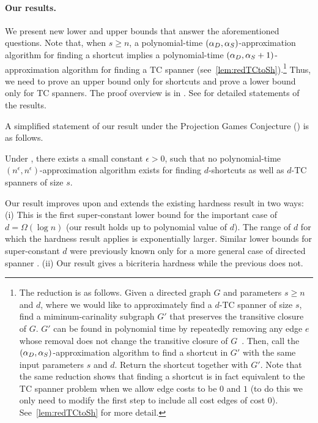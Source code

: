 \paragraph{Our results.} 
We present new lower and upper bounds that answer the aforementioned questions. 
Note that, when $s\geq n$, a polynomial-time $(\alpha_D,\alpha_S)$-approximation algorithm for finding a shortcut implies a polynomial-time $(\alpha_D,\alpha_S+1)$-approximation algorithm for finding a TC spanner (see~\cref{lem:redTCtoSh}).\footnote{
The reduction is as follows. Given a directed graph $G$ and parameters $s\geq n$ and $d$, where we would like to approximately find a $d$-TC spanner of size $s$, find a miminum-carinality subgraph $G'$ that preserves the transitive closure of $G$. $G'$ can be found in polynomial time by repeatedly removing any edge $e$ whose removal does not change the transitive closure of $G$~\cite{AhoGU72}.
Then, call the $(\alpha_D, \alpha_S)$-approximation algorithm to find a shortcut in $G'$ with the same input parameters $s$ and $d$. Return the shortcut together with $G'$. 
Note that the same reduction shows that finding a shortcut is in fact equivalent to the TC spanner problem when we allow edge costs to be $0$ and $1$ (to do this we only need to modify the first step to include all cost edges of cost 0). See~\cref{lem:redTCtoSh} for more detail.}
Thus, we need to prove an upper bound only for shortcuts and prove a lower bound only for TC spanners. The proof overview is in . See  for detailed statements of the results.


A simplified statement of our result under the Projection Games Conjecture (\conj{}) \cite{Moshkovitz15} is as follows. 


\begin{theorem}\label{thm:intro:lowerbound}
		Under \conj{}, there exists a small constant $\epsilon>0$, such that no polynomial-time $(n^{\epsilon},n^{\epsilon})$-approximation algorithm exists for finding $d$-shortcuts as well as $d$-TC spanners of size $s$. 
\end{theorem}



Our result improves upon and extends the existing hardness result in two ways: (i) This is the first super-constant lower bound for the important case of $d = \Omega(\log n)$ (our result holds up to polynomial value of $d$). The range of $d$ for which the hardness result applies is exponentially larger. Similar lower bounds for super-constant $d$ were previously known only for a more general case of directed spanner \cite{ElkinP07}. (ii) Our result gives a bicriteria hardness while the previous does not.  

